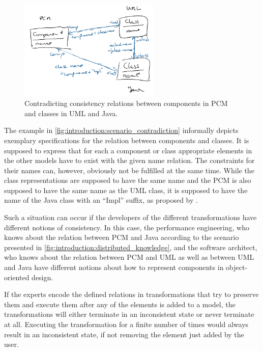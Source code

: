 \begin{figure}
    \centering
    \includegraphics[width=0.6\textwidth]{figures/prologue/introduction/scenario_contradiction.png}
    \caption[Example for transformation contradictions]{Contradicting consistency relations between components in \gls{PCM} and classes in \gls{UML} and Java.}
    \label{fig:introduction:scenario_contradiction}
\end{figure}

The example in \autoref{fig:introduction:scenario_contradiction} informally depicts exemplary specifications for the relation between components and classes.
It is supposed to express that for each a component or class appropriate elements in the other models have to exist with the given name relation.
The constraints for their names can, however, obviously not be fulfilled at the same time.
While the class representations are supposed to have the same name and the \gls{PCM} is also supposed to have the same name as the \gls{UML} class, it is supposed to have the name of the Java class with an \enquote{Impl} suffix, as proposed by \textcite{langhammer2017a}.

Such a situation can occur if the developers of the different transformations have different notions of consistency.
In this case, the performance engineering, who knows about the relation between \gls{PCM} and Java according to the scenario presented in \autoref{fig:introduction:distributed_knowledge}, and the software architect, who knows about the relation between \gls{PCM} and \gls{UML} as well as between \gls{UML} and Java have different notions about how to represent components in object-oriented design.

If the experts encode the defined relations in transformations that try to preserve them and execute them after any of the elements is added to a model, the transformations will either terminate in an inconsistent state or never terminate at all.
Executing the transformation for a finite number of times would always result in an inconsistent state, if not removing the element just added by the user.

